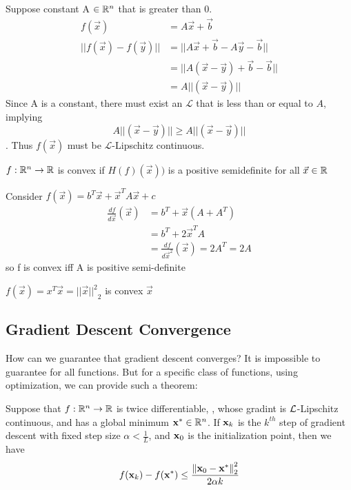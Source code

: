 \begin{example}
Suppose constant A $\in \R^n$ that is greater than 0.
\begin{align}
    f(\vec{x})&=A\vec{x}+\vec{b}\\
||f(\vec{x})-f(\vec{y})||&=||A\vec{x}+\vec{b}-A\vec{y}-\vec{b}||\\
&=||A(\vec{x}-\vec{y})+\vec{b}-\vec{b}||\\
&=A||(\vec{x}-\vec{y})||
\end{align}
Since A is a constant, there must exist an $\mathcal{L}$ that is less than or equal to $A$, implying 
\begin{equation}
    A||(\vec{x}-\vec{y})||\geq A||(\vec{x}-\vec{y})||
\end{equation}. Thus $f(\vec{x})$ must be $\mathcal{L}$-Lipschitz continuous.
\end{example}

\begin{definition}
$f: \R^n\rightarrow\R$ is convex if $H(f)(\vec{x}))$ is a positive semidefinite for all $\vec{x}\in \R$
\end{definition}

\begin{example}
Consider $f(\vec{x})=b^T\vec{x} +\vec{x}^T A\vec{x}+c$
\begin{align*}
\frac{df}{d\vec{x}}(\vec{x})&=b^T+\vec{x}(A+A^T)\\
&=b^T+2\vec{x}^TA\\
&=\frac{df}{d\vec{x}^2}(\vec{x})=2A^T=2A
\end{align*}
so f is convex iff A is positive semi-definite
\end{example}

\begin{example}
$f(\vec{x})=x^T\vec{x}={||\vec{x}||^2}_2$ is convex $\vec{x}$
\end{example}

\subsection{Gradient Descent Convergence}
\label{GD-convergence}

How can we guarantee that gradient descent converges? It is impossible to guarantee for all functions. But for a specific class of functions, using \cvx{} optimization, we can provide such a theorem:

\begin{theorem}
    Suppose that $f : \R^n \rightarrow \R$ is twice differentiable, \cvx, whose gradint is $\Lip$-Lipschitz continuous, and has a global minimum $\vx^* \in \R^n$. 
    If $\vx_{k}$ is the $k^{th}$ step of gradient descent with fixed step size $\alpha < \frac{1}{L}$, and $\vx_0$ is the initialization point, then we have
    $$f(\vx_k) - f(\vx^*) \leq \frac{\norm{\vx_0 - \vx^*}_2^2}{2\alpha k}$$
\end{theorem}


